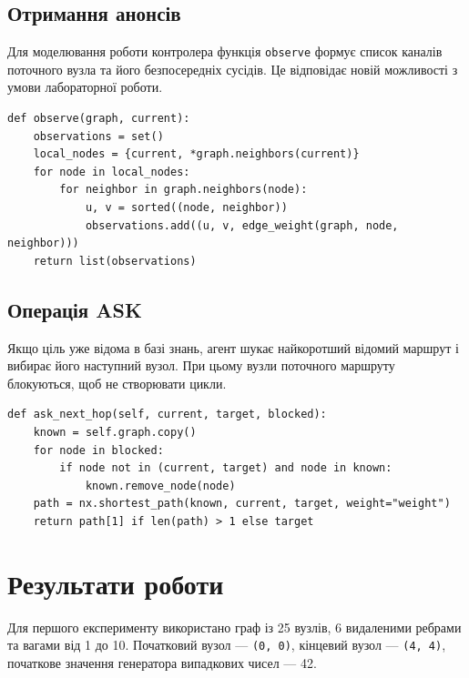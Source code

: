 \documentclass[12pt,a4paper]{article}
\begin{document}
\subsection{Отримання анонсів}

Для моделювання роботи контролера функція \texttt{observe} формує список
каналів поточного вузла та його безпосередніх сусідів. Це відповідає новій
можливості з умови лабораторної роботи.

\begin{listing}[H]
\begin{verbatim}
def observe(graph, current):
    observations = set()
    local_nodes = {current, *graph.neighbors(current)}
    for node in local_nodes:
        for neighbor in graph.neighbors(node):
            u, v = sorted((node, neighbor))
            observations.add((u, v, edge_weight(graph, node, neighbor)))
    return list(observations)
\end{verbatim}
\caption{Формування локального спостереження з анонсами}
\end{listing}

\subsection{Операція ASK}

Якщо ціль уже відома в базі знань, агент шукає найкоротший відомий маршрут
і вибирає його наступний вузол. При цьому вузли поточного маршруту блокуються,
щоб не створювати цикли.

\begin{listing}[H]
\begin{verbatim}
def ask_next_hop(self, current, target, blocked):
    known = self.graph.copy()
    for node in blocked:
        if node not in (current, target) and node in known:
            known.remove_node(node)
    path = nx.shortest_path(known, current, target, weight="weight")
    return path[1] if len(path) > 1 else target
\end{verbatim}
\caption{Вибір наступної дії на основі відомої частини графа}
\end{listing}

\section{Результати роботи}

Для першого експерименту використано граф із 25 вузлів, 6 видаленими ребрами
та вагами від 1 до 10. Початковий вузол --- \texttt{(0, 0)}, кінцевий вузол ---
\texttt{(4, 4)}, початкове значення генератора випадкових чисел --- 42.
\end{document}
